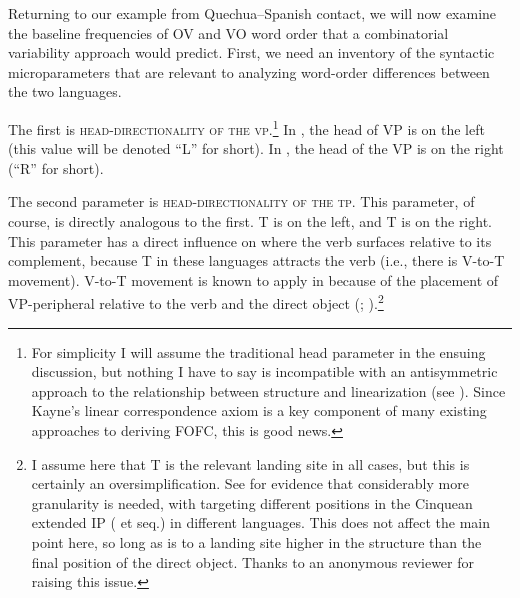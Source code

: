 \documentclass[output=paper]{langsci/langscibook}
\begin{document}
Returning to our example from Quechua--Spanish contact, we will now examine the
baseline frequencies of OV and VO word order that a combinatorial variability
approach would predict.  First, we need an inventory of the syntactic
microparameters that are relevant to analyzing word-order differences between
the two languages.%

The first is \textsc{head-directionality of the vp}.\footnote{For simplicity I
    will assume the traditional head parameter in the ensuing discussion, but
    nothing I have to say is incompatible with an antisymmetric approach to the
    relationship between structure and linearization (see \citealt{Kayne1994}).
Since Kayne’s linear correspondence axiom is a key component of many existing
approaches to deriving FOFC, this is good news.}  In , the head of VP is
on the left (this value will be denoted \enquote{L} for short).   In , the head
of the VP is on the right (\enquote{R} for short).

The second parameter is \textsc{head-directionality of the tp}.  This
parameter, of course, is directly analogous to the first.   T is on the
left, and  T is on the right.  This parameter has a direct influence on
where the verb surfaces relative to its complement, because T in these
languages attracts the verb (i.e., there is V-to-T movement).  V-to-T movement
is known to apply in  because of the placement of VP-peripheral 
relative to the verb and the direct object (\citealt{Pollock1989};
\citealt{Zagona2002}).\footnote{I assume here that T is the relevant landing
    site in all cases, but this is certainly an oversimplification.  See
    \textcite{Schifano2015,Schifano2018} for evidence that considerably more
    granularity is needed, with  targeting different positions in
    the Cinquean extended IP (\citealt{Cinque1999} et seq.) in different
    languages.  This does not affect the main point here, so long as
     is to a landing site higher in the structure than the final position
    of the direct object.  Thanks to an anonymous reviewer for raising this issue.}\largerpage[2]
\end{document}
